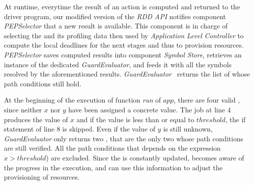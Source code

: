 At runtime, everytime the result of an action is computed and returned to the driver program, our modified version of the  \textit{RDD API} notifies component \textit{PEPSelector} that a new result is available. This component is in charge of selecting the \plan and its profiling data then used by \textit{Application Level Controller} to compute the local deadlines for the next stages and thus to provision resources. \textit{PEPSelector} saves computed results into component \textit{Symbol Store}, retrieves an instance of the dedicated \textit{GuardEvaluator}, and feeds it with all the symbols resolved 
by the aforementioned results. \textit{GuardEvaluator}~\cite{Baresi-Quattrocchi-Denaro:2019} returns the list of \plan whose path conditions still hold.

At the beginning of the execution of function \textit{run} of $app$, there are four valid \plans, since neither $x$ nor $y$ have been assigned a concrete value. The job at line $4$ produces the value of $x$ and if the value is less than or equal to $threshold$,  the if statement of line $8$ is skipped. Even if the value of $y$ is still unknown,  \textit{GuardEvaluator} only returns two \plans, that are the only two \plans whose path conditions are still verified. All the path conditions that depends on the expression $x > threshold$) are excluded. Since the \plan is constantly updated, \cSpark becomes aware of the progress in the execution, and can use this information to adjust the provisioning of resources.  


